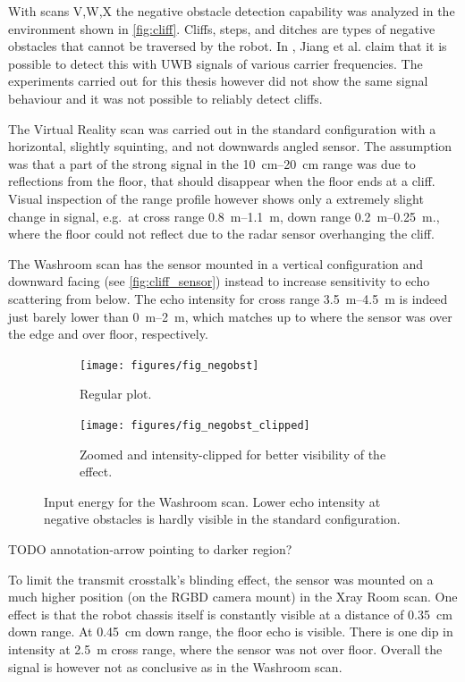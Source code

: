 With scans V,W,X the negative obstacle detection capability was
analyzed in the environment shown in \cref{fig:cliff}. Cliffs, steps, and ditches are types of negative obstacles that cannot be traversed by the robot. In \cite{Jiang2015}, Jiang et al. claim that it is possible to detect this with UWB signals of various carrier frequencies. The experiments carried out for this thesis however did not show the same signal behaviour and it was not possible to reliably detect cliffs.

The Virtual Reality scan was carried out in the standard configuration
with a horizontal, slightly squinting, and not downwards angled sensor.
The assumption was that a part of the strong signal in the \SIrange{10}{20}{cm}
range was due to reflections from the floor, that should disappear when the
floor ends at a cliff. Visual inspection of the range profile however
shows only a extremely slight change in signal, e.g.~at cross range
\SIrange{0.8}{1.1}{m}, down range \SIrange{0.2}{0.25}{m}., where the floor could not reflect due to the radar sensor overhanging the cliff.

The Washroom scan has the sensor mounted in a vertical configuration and
downward facing (see \cref{fig:cliff_sensor}) instead to increase sensitivity to echo scattering from below. The echo intensity for cross range \SIrange{3.5}{4.5}{m} is indeed just
barely lower than \SIrange{0}{2}{m}, which matches up to where the sensor was over
the edge and over floor, respectively.

\begin{figure}[htbp]
    \centering
    \begin{subfigure}[t]{.475\textwidth}
        \texttt{[image: figures/fig\_negobst]}
        \caption{Regular plot.}
        \label{fig:negobst}
    \end{subfigure}%
    \hfill%
    \begin{subfigure}[t]{.475\textwidth}
        \texttt{[image: figures/fig\_negobst\_clipped]}
        \caption{Zoomed and intensity-clipped for better visibility of the effect.}
        \label{fig:negobst_clipped}
    \end{subfigure}
    \caption{Input energy for the Washroom scan. Lower echo intensity at negative obstacles is hardly visible in the standard configuration.}
\end{figure}

TODO annotation-arrow pointing to darker region?

To limit the transmit crosstalk's blinding effect, the sensor was
mounted on a much higher position (on the RGBD camera mount) in the Xray
Room scan. One effect is that the robot chassis itself is constantly
visible at a distance of \SI{0.35}{cm} down range. At \SI{0.45}{cm} down range, the
floor echo is visible. There is one dip in intensity at \SI{2.5}{m} cross
range, where the sensor was not over floor. Overall the signal is
however not as conclusive as in the Washroom scan.

